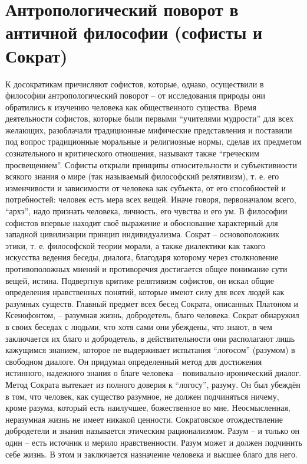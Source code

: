 \documentclass[12pt]{article}
\begin{document}
\section{Антропологический поворот в античной философии (софисты и Сократ)}
К досократикам причисляют софистов, которые, однако, осуществили в философии антропологический поворот
–  от  исследования  природы  они  обратились  к  изучению  человека  как  общественного  существа.  Время
деятельности  софистов,  которые  были  первыми  “учителями  мудрости”  для  всех  желающих,  разоблачали
традиционные мифические представления и поставили под вопрос традиционные моральные и религиозные
нормы,  сделав  их  предметом  сознательного  и  критического  отношения,  называют  также  “греческим
просвещением”. Софисты открыли принципы относительности и субъективности всякого знания о мире (так
называемый философский релятивизм), т. е. его изменчивости и зависимости от человека как субъекта, от его
способностей и потребностей: человек есть мера всех вещей. Иначе говоря, первоначалом всего, “архэ”, надо
признать человека, личность, его чувства и его ум. В философии софистов впервые находит своё выражение и
обоснование характерный для западной цивилизации принцип индивидуализма. 
Сократ – основоположник этики, т. е. философской теории морали, а также диалектики как такого искусства
ведения беседы, диалога, благодаря которому через столкновение противоположных мнений и противоречия
достигается общее понимание сути вещей, истина. Подвергнув критике релятивизм софистов, он искал общие
определения нравственных понятий, которые имеют силу для всех людей как разумных существ. Главный
предмет  всех  бесед  Сократа,  описанных  Платоном  и  Ксенофонтом,  –  разумная  жизнь,  добродетель,  благо
человека. 
Сократ обнаружил в своих беседах с людьми, что хотя сами они убеждены, что знают, в чем заключается их
благо и добродетель, в действительности они располагают лишь кажущимся знанием, которое не выдерживает
испытания  “логосом”  (разумом)  в  свободном  диалоге.  Он  придумал  определенный  метод  для  достижения
истинного, надежного знания о благе человека – повивально-иронический диалог. Метод Сократа вытекает из
полного доверия к “логосу”, разуму. Он был убеждён в том, что человек, как существо разумное, не должен
подчиняться ничему, кроме разума, который есть наилучшее, божественное во мне. Неосмысленная, неразумная
жизнь не имеет никакой ценности. Сократовское отождествление добродетели и знания называется этическим
рационализмом. Разум – и только он один – есть источник и мерило нравственности. Разум может и должен
подчинить себе жизнь. В этом и заключается назначение человека и высшее благо для него. 
\end{document}
